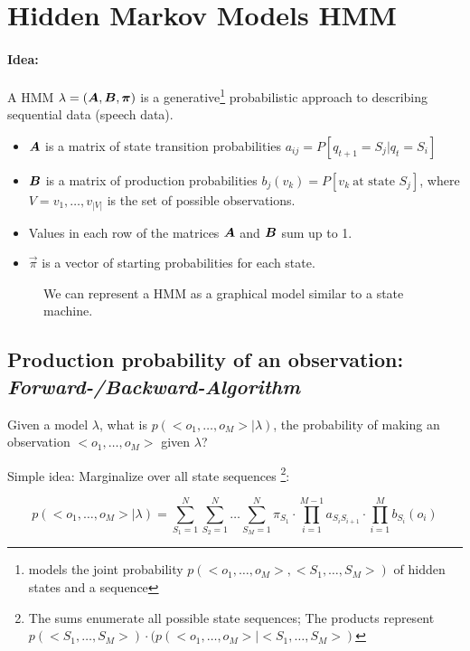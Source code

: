 
\section{Hidden Markov Models HMM}
\paragraph{Idea:}  A HMM \(\lambda = (\bm{A}, \bm{B}, \bm{\pi})\) is a generative\footnote{models the joint probability $p(<o_1,\dots, o_M>, <S_1,\dots, S_M>)$ of hidden states and a sequence} probabilistic approach to describing sequential data (\eg speech data).

\begin{itemize}
	\item $\bm{A}$ is a matrix of state transition probabilities \(a_{ij} = P[q_{t+1} = S_j | q_t = S_i]\)
	\item $\bm{B}$ is a matrix of production probabilities \(b_j(v_k) = P[v_k\ \text{at state } S_j]\), where \(V={v_1,\dots,v_{|V|}}\) is the set of possible observations.
	\item Values in each row of the matrices $\bm{A}$ and $\bm{B}$ sum up to 1.
	\item \(\vec{\pi}\) is a vector of starting probabilities for each state.
\end{itemize}

\begin{figure}[H]
	\centering
	
	\caption[Hidden Markov Model]{We can represent a HMM as a graphical model similar to a state machine.}
\end{figure}



\subsection{Production probability of an observation: \emph{Forward-/Backward-Algorithm}}
Given a model \(\lambda\), what is \(p(<o_1,\dots, o_M>|\lambda)\), the probability of making an observation \(<o_1,\dots, o_M>\) given \(\lambda\)?

Simple idea: Marginalize over all state sequences \footnote{The sums enumerate all possible state sequences; The products represent \(p(<S_1,\dots,S_M>) \cdot (p(<o_1,\dots, o_M>|<S_1,\dots,S_M>)\)}:

\[p(<o_1,\dots,o_M>|\lambda) = \sum_{S_1=1}^{N} \sum_{S_2=1}^{N} \dots \sum_{S_M=1}^{N} \pi_{S_1} \cdot \prod_{i=1}^{M-1} a_{S_i S_{i+1}} \cdot \prod_{i=1}^{M} b_{S_i}(o_i)\]

